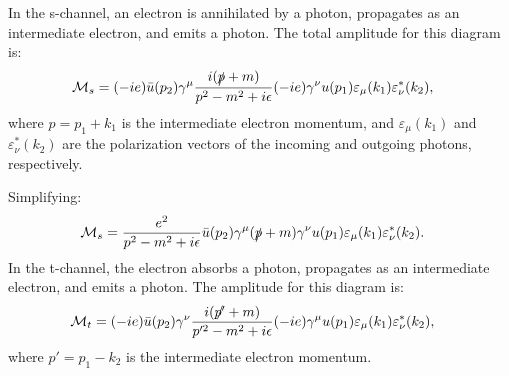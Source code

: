 \begin{enumerate}
In the s-channel, an electron is annihilated by a photon, propagates as an intermediate electron, and emits a photon. The total amplitude for this diagram is:
\begin{align}
    \mathcal{M}_s &= (-ie) \bar{u}(p_2) \gamma^\mu \frac{i(\slashed{p} + m)}{p^2 - m^2 + i\epsilon} (-ie) \gamma^\nu u(p_1) \varepsilon_\mu(k_1) \varepsilon^*_\nu(k_2), \label{eq:s-channel}
\end{align}
where $p = p_1 + k_1$ is the intermediate electron momentum, and $\varepsilon_\mu(k_1)$ and $\varepsilon^*_\nu(k_2)$ are the polarization vectors of the incoming and outgoing photons, respectively.

Simplifying:
\begin{align}
    \mathcal{M}_s &= \frac{e^2}{p^2 - m^2 + i\epsilon} \bar{u}(p_2) \gamma^\mu (\slashed{p} + m) \gamma^\nu u(p_1) \varepsilon_\mu(k_1) \varepsilon^*_\nu(k_2).
\end{align}
In the t-channel, the electron absorbs a photon, propagates as an intermediate electron, and emits a photon. The amplitude for this diagram is:
\begin{align}
    \mathcal{M}_t &= (-ie) \bar{u}(p_2) \gamma^\nu \frac{i(\slashed{p'} + m)}{p'^2 - m^2 + i\epsilon} (-ie) \gamma^\mu u(p_1) \varepsilon_\mu(k_1) \varepsilon^*_\nu(k_2), \label{eq:t-channel}
\end{align}
where $p' = p_1 - k_2$ is the intermediate electron momentum.


\end{enumerate}
